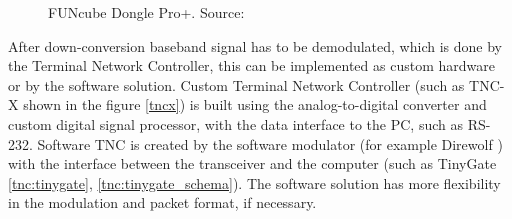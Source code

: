 \begin{minipage}{\linewidth}
\begin{minipage}{0.45\linewidth}
\begin{figure}[H]
            \caption{FUNcube Dongle Pro+. Source: \cite{funcube}}
            \label{funcube}
        \end{figure}
    \end{minipage}
\end{minipage}

After down-conversion baseband signal has to be demodulated, which is done by the Terminal Network Controller, this can be implemented as custom hardware or by the software solution. Custom Terminal Network Controller (such as TNC-X shown in the figure \ref{tncx}) is built using the analog-to-digital converter and custom digital signal processor, with the data interface to the PC, such as RS-232. Software TNC is created by the software modulator (for example Direwolf \cite{direwolf}) with the interface between the transceiver and the computer (such as TinyGate \ref{tnc:tinygate}, \ref{tnc:tinygate_schema}). The software solution has more flexibility in the modulation and packet format, if necessary.

